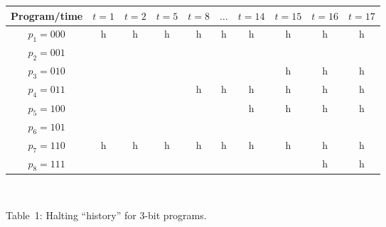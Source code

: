 \documentclass[12pt,twoside,openright]{report}
\begin{document}
\begin{center}
\begin{tabular}{|c|c|c|c|c|c|c|c|c|c|}\hline Program/time & $t=1$ & $t=2$ & $t=5$ & $t=8$ & $\ldots$ & $ t=14$ & $t=15$ & $t=16$ & $t=17$\\
\hline
$p_{1}=000$ & h & h & h & h & h & h & h & h & h \\
\hline
$p_{2}=001$ &   &   &   &   &   &   &   &   &  \\
\hline
$p_{3}=010$ &   &   &   &   &   &   & h & h & h \\
\hline
$p_{4}=011$ &   &   &   & h & h & h & h & h & h \\
\hline                              
$p_{5}=100$ &   &   &   &   &   & h & h & h & h \\
\hline
$p_{6}=101$ &   &   &   &   &   &   &   &   &  \\
\hline
$p_{7}=110$ & h & h & h & h & h & h & h & h & h \\
\hline
$p_{8}=111$ &   &   &   &   &   &   &   & h & h\\
\hline\end{tabular}\\

\bigskip

Table~1:  Halting  ``history'' for 3-bit programs.
\end{center}
\end{document}
